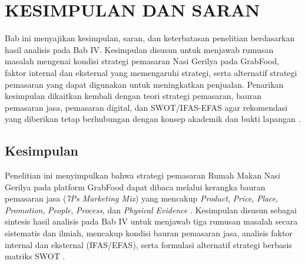\chapter{KESIMPULAN DAN SARAN}

Bab ini menyajikan kesimpulan, saran, dan keterbatasan penelitian berdasarkan hasil analisis pada Bab IV. Kesimpulan disusun untuk menjawab rumusan masalah mengenai kondisi strategi pemasaran Nasi Gerilya pada GrabFood, faktor internal dan eksternal yang memengaruhi strategi, serta alternatif strategi pemasaran yang dapat digunakan untuk meningkatkan penjualan. Penarikan kesimpulan dikaitkan kembali dengan teori strategi pemasaran, bauran pemasaran jasa, pemasaran digital, dan SWOT/IFAS-EFAS agar rekomendasi yang diberikan tetap berhubungan dengan konsep akademik dan bukti lapangan \parencite{kotler2023principlesmarketing,wirtz2024servicesmarketing,chaffey2022digitalmarketing,david2023strategicmanagement}.

\section{Kesimpulan}

Penelitian ini menyimpulkan bahwa strategi pemasaran Rumah Makan Nasi Gerilya pada platform GrabFood dapat dibaca melalui kerangka bauran pemasaran jasa (\textit{7Ps Marketing Mix}) yang mencakup \textit{Product}, \textit{Price}, \textit{Place}, \textit{Promotion}, \textit{People}, \textit{Process}, dan \textit{Physical Evidence} \parencite{kotler2023principlesmarketing,wirtz2024servicesmarketing}. Kesimpulan disusun sebagai sintesis hasil analisis pada Bab IV untuk menjawab tiga rumusan masalah secara sistematis dan ilmiah, mencakup kondisi bauran pemasaran jasa, analisis faktor internal dan eksternal (IFAS/EFAS), serta formulasi alternatif strategi berbasis matriks SWOT \parencite{david2023strategicmanagement,rangkuti2016analisisSWOT}.

